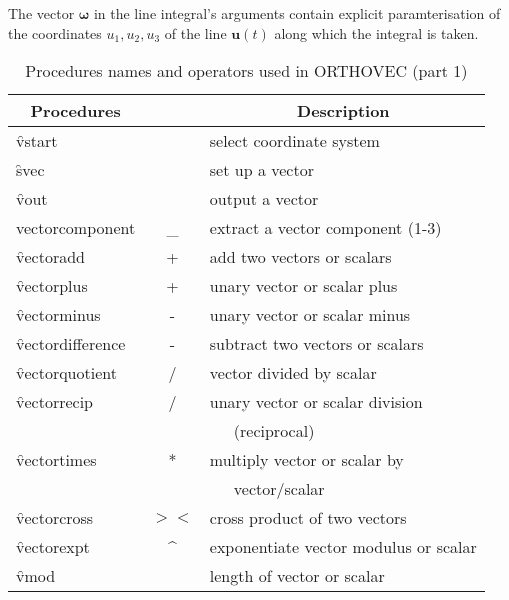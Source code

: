 The vector $\mathbf{\omega}$ in the line integral's arguments contain
explicit paramterisation of the coordinates $u_1, u_2, u_3$ of the
line $\mathbf{u}(t)$ along which the integral is taken.

\begin{table}
\begin{center}
\begin{tabular}{|l c l|} \hline 
\multicolumn{1}{|c}{Procedures} & & \multicolumn{1}{c|}{Description} \\ \hline
  \f{vstart} & & select coordinate system \\[\baselineskip]
  \f{svec} & & set up a vector \\
  \f{vout} & & output a vector \\
\f{ vectorcomponent} & \_ & extract a vector component (1-3) \\[\baselineskip]
\f{vectoradd} & + & add two vectors or scalars \\ 
\f{vectorplus} & + & unary vector or scalar plus\\ 
\f{vectorminus} & - & unary vector or scalar minus\\ 
\f{vectordifference} & - & subtract two vectors or scalars \\ 
\f{vectorquotient} & / & vector divided by scalar \\ 
\f{vectorrecip} & / & unary vector or scalar division \\ & & \ \ \ (reciprocal)\\ 
\f{vectortimes} & * & multiply vector or scalar by \\ & & \ \ \ vector/scalar \\ 
\f{vectorcross} & $><$ & cross product of two vectors \\ 
\f{vectorexpt} & \textasciicircum{} & exponentiate vector modulus or scalar \\
\f{vmod} & & length of vector or scalar \\ \hline
\end{tabular}
\end{center}
\caption{Procedures names and operators used in \textsc{ORTHOVEC} (part 1)}
\end{table}

